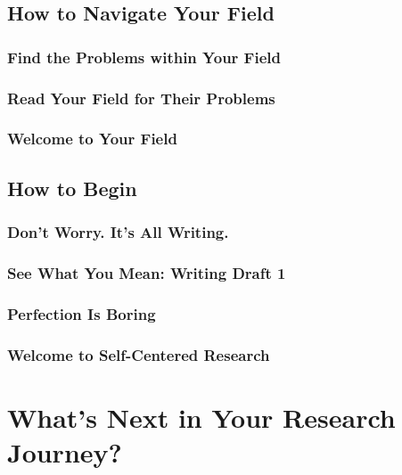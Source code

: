 \documentclass[11pt]{article}
\begin{document}
\subsection{How to Navigate Your Field}
\subsubsection{Find the Problems within Your Field}
\subsubsection{Read Your Field for Their Problems}
\subsubsection{Welcome to Your Field}

\subsection{How to Begin}
\subsubsection{Don’t Worry. It’s All Writing.}
\subsubsection{See What You Mean: Writing Draft 1}
\subsubsection{Perfection Is Boring}
\subsubsection{Welcome to Self-Centered Research}

\section{What's Next in Your Research Journey?}


\newpage


\end{document}
